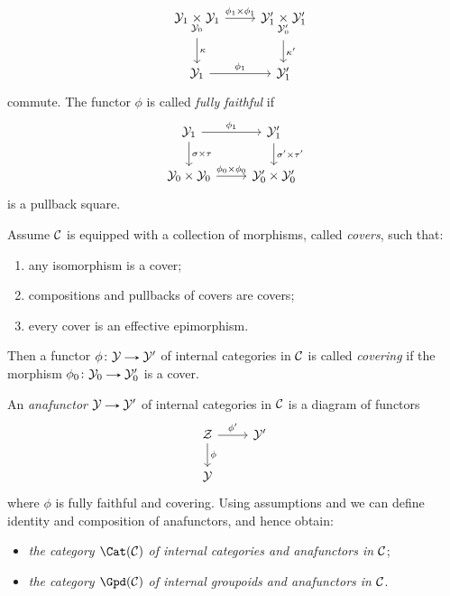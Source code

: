 \begin{appendices}
\begin{definitions}
\[    \quad
    \begin{tikzcd}
      \Y_1 \underset{\Y_0}{\times} \Y_1 \ar[r, "\phi_1 \times \phi_1"]
      \ar[d,
      "\kappa"] & \Y'_1 \underset{\Y'_0}{\times} \Y'_1 \ar[d, "\kappa'"] \\
      \Y_1 \ar[r, "\phi_1"] & \Y'_1
    \end{tikzcd}
    \]
    commute. The functor $\phi$ is called \emph{fully faithful} if
    \[
    \begin{tikzcd}
      \Y_1 \ar[r, "\phi_1"] \ar[d, "\sigma \times \tau"] & \Y'_1
      \ar[d, "\sigma' \times \tau'"] \\ \Y_0 \times \Y_0 \ar[r, "\phi_0
      \times \phi_0"] & \Y'_0 \times \Y'_0
    \end{tikzcd}
    \]
    is a pullback square.
  \end{definitions}

  \begin{definitions}
    \label{anafunctor}
    Assume $\mathcal{C}$ is equipped with a collection of morphisms, called
    \emph{covers}, such that:
    \begin{enumerate}
    \item \label{cover-iso} any isomorphism is a cover;
    \item \label{cover-stab} compositions and pullbacks of covers are
      covers;
    \item \label{cover-eff} every cover is an effective epimorphism.
    \end{enumerate}
    Then a functor $\phi \c \Y \to \Y'$ of internal categories in $\mathcal{C}$
    is called \emph{covering} if the morphism $\phi_0 \c \Y_0 \to
    \Y'_0$ is a cover.

    An \emph{anafunctor} $\Y \to \Y'$ of internal categories in $\mathcal{C}$
    is a diagram of functors
    \[
    \begin{tikzcd}
      \Z \ar[r, "\phi'"] \ar[d, "\phi"] & \Y' \\ \Y &
    \end{tikzcd}
    \]
    where $\phi$ is fully faithful and covering. Using assumptions
     and  we can define identity and
    composition of anafunctors, and hence obtain:
    \begin{itemize}
    \item \emph{the category $\Cat(\C)$ of internal categories and
        anafunctors in $\mathcal{C}$};
    \item \emph{the category $\Gpd(\C)$ of internal groupoids and
        anafunctors in $\mathcal{C}$}.
    \end{itemize}


\end{definitions}
\end{appendices}
